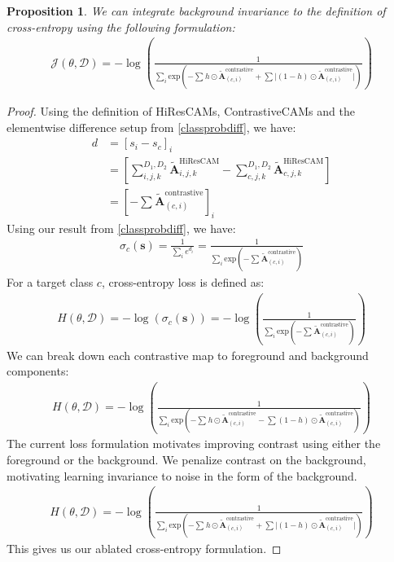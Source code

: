 \documentclass{article}
\newtheorem{theorem}{Proposition}
\begin{document}
\begin{theorem} We can integrate background invariance to the definition of cross-entropy using the following formulation:
	\begin{gather}
		\mathcal{J}(\theta, \mathcal{D}) = -\log \left( \frac{1}{\sum_i \text{exp}\left({-\sum^{}h \odot \tilde{\mathcal{\bm{A}}}^{\text{contrastive}}_{(c, i)} + \sum |(1-h) \odot \tilde{\mathcal{\bm{A}}}^{\text{contrastive}}_{(c, i)}}|\right)} \right)
	\end{gather}
\end{theorem}
\begin{proof} Using the definition of HiResCAMs, ContrastiveCAMs and the elementwise difference setup from \ref{classprobdiff}, we have:
	\begin{align}
		d &= [s_i - s_c]_i \\
		&= \left[\sum^{D_1,D_2}_{i,j,k} \tilde{\mathcal{\bm{A}}}_{i,j,k}^{\text{HiResCAM}} - \sum^{D_1,D_2}_{c,j,k} \tilde{\mathcal{\bm{A}}}_{c,j,k}^{\text{HiResCAM}}\right] \\
		&= \left[ -\sum^{}\tilde{\mathcal{\bm{A}}}^{\text{contrastive}}_{(c, i)} \right]_i
	\end{align}
	Using our result from \ref{classprobdiff}, we have:
	\begin{gather}
		\sigma_c(\bm{s}) = \frac{1}{\sum_i e^{d_i}} = \frac{1}{\sum_i \text{exp}({-\sum^{}\tilde{\mathcal{\bm{A}}}^{\text{contrastive}}_{(c, i)}})}
	\end{gather}
	For a target class $c$, cross-entropy loss is defined as:
	\begin{gather}
		H(\theta, \mathcal{D}) = -\log \left( \sigma_c(\bm{s}) \right) = -\log \left( \frac{1}{\sum_i \text{exp}({-\sum^{}\tilde{\mathcal{\bm{A}}}^{\text{contrastive}}_{(c, i)}})} \right)
	\end{gather}
	We can break down each contrastive map to foreground and background components:
	\begin{gather}
		H(\theta, \mathcal{D}) = -\log \left( \frac{1}{\sum_i \text{exp}\left({-\sum^{}h \odot \tilde{\mathcal{\bm{A}}}^{\text{contrastive}}_{(c, i)} - \sum (1-h) \odot \tilde{\mathcal{\bm{A}}}^{\text{contrastive}}_{(c, i)}}\right)} \right)
	\end{gather}
	The current loss formulation motivates improving contrast using either the foreground or the background. We penalize contrast on the background, motivating learning invariance to noise in the form of the background.
	\begin{gather}
		H(\theta, \mathcal{D}) = -\log \left( \frac{1}{\sum_i \text{exp}\left({-\sum^{}h \odot \tilde{\mathcal{\bm{A}}}^{\text{contrastive}}_{(c, i)} + \sum |(1-h) \odot \tilde{\mathcal{\bm{A}}}^{\text{contrastive}}_{(c, i)}}|\right)} \right)
	\end{gather}
	This gives us our ablated cross-entropy formulation.
\end{proof}
\end{document}
